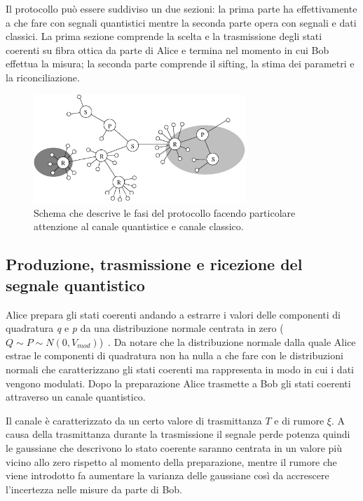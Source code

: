 Il protocollo pu\`o essere suddiviso un due sezioni: la prima parte ha effettivamente a che fare con segnali quantistici mentre la seconda parte opera con segnali e dati classici. La prima sezione comprende la scelta e la trasmissione degli stati coerenti su fibra ottica da parte di Alice e termina nel momento in cui Bob effettua la misura; la seconda parte comprende il sifting, la stima dei parametri e la riconciliazione.

\begin{figure}[bht] 
\begin{center}
\includegraphics[width=8cm]{figure/esempio-figura-1.eps} 
\end{center}
\caption{Schema che descrive le fasi del protocollo facendo particolare attenzione al canale quantistice e canale classico.} 
\end{figure}

\subsection{Produzione, trasmissione e ricezione del segnale quantistico}\label{subse:sottosezione2-1-1}
Alice prepara gli stati coerenti andando a estrarre i valori delle componenti di quadratura \textit{q} e \textit{p} da una distribuzione normale centrata in zero ($Q\sim P\sim N (0, V_{mod})$)~\cite{https://doi.org/10.1002/qute.201800011}. Da notare che la distribuzione normale dalla quale Alice estrae le componenti di quadratura non ha nulla a che fare con le distribuzioni normali che caratterizzano gli stati coerenti ma rappresenta in modo in cui i dati vengono modulati. Dopo la preparazione Alice trasmette a Bob gli stati coerenti attraverso un canale quantistico.

Il canale \`e caratterizzato da un certo valore di trasmittanza $T$ e di rumore $\xi$. A causa della trasmittanza durante la trasmissione il segnale perde potenza quindi le gaussiane che descrivono lo stato coerente saranno centrata in un valore pi\`u vicino allo zero rispetto al momento della preparazione, mentre il rumore che viene introdotto fa aumentare la varianza delle gaussiane cos\`i da accrescere l'incertezza nelle misure da parte di Bob.

